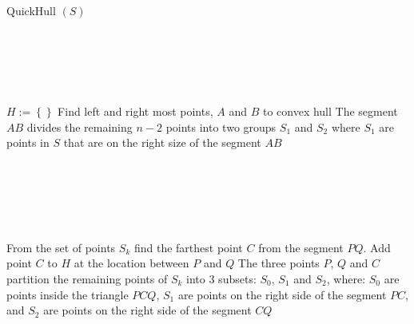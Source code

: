 \documentclass[12pt]{article}
\begin{document}
\singlespacing
\begin{algorithm}[H]
  \caption{QuickHull $ \left( S \right) $}
  \Comment{}\\
   \\
   \\
   \\
  \begin{algorithmic}[1]
    \State $H := \left\{  \right\} $ 
    \State Find left and right most points, $A$ and $B$ to convex hull
    \State The segment $AB$ divides the remaining $n - 2$ points into two groups $S_1$ and $S_2$ where $S_1$ are points
    in $S$ that are on the right size of the segment $AB$
    \State {}
    \State {}

    \\
    \\

     \\
     \\
    \\
    \State \Return
    \EndIf
    \State From the set of points $S_k$ find the farthest point $C$ from the segment $PQ$.
    \State Add point $C$ to $H$ at the location between $P$ and $Q$
    \State The three points $P$, $Q$ and $C$ partition the remaining points of $S_k$ into 3 subsets: $S_0$, $S_1$ and
    $S_2$, where:
    \State $S_0$ are points inside the triangle $PCQ$, $S_1$ are points on the right side of the segment $PC$, and
    $S_2$ are points on the right side of the segment $CQ$
    \State {}
    \State {}
    \EndFunction
  \end{algorithmic}
\end{algorithm}
\doublespacing
\end{document}
